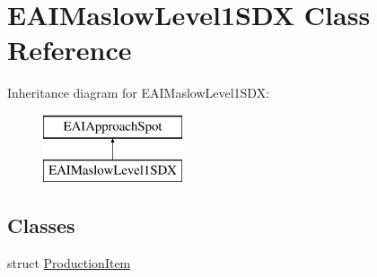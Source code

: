\hypertarget{class_e_a_i_maslow_level1_s_d_x}{}\section{E\+A\+I\+Maslow\+Level1\+S\+DX Class Reference}
\label{class_e_a_i_maslow_level1_s_d_x}
Inheritance diagram for E\+A\+I\+Maslow\+Level1\+S\+DX\+:\begin{figure}[H]
\begin{center}
\leavevmode
\includegraphics[height=2.000000cm]{class_e_a_i_maslow_level1_s_d_x}
\end{center}
\end{figure}
\subsection*{Classes}
\begin{DoxyCompactItemize}
\item 
struct \mbox{\hyperlink{struct_e_a_i_maslow_level1_s_d_x_1_1_production_item}{Production\+Item}}
\end{DoxyCompactItemize}
